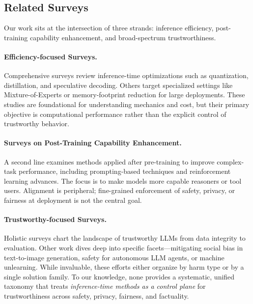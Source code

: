 \subsection{Related Surveys}
Our work sits at the intersection of three strands: inference efficiency, post-training capability enhancement, and broad-spectrum trustworthiness.

\paragraph{Efficiency-focused Surveys.}
Comprehensive surveys review inference-time optimizations such as quantization, distillation, and speculative decoding\citep{survey:inference_efficiency1}. Others target specialized settings like Mixture-of-Experts\citep{survey:inference_moe} or memory-footprint reduction for large deployments\citep{survey:inference_efficiency2}. These studies are foundational for understanding mechanics and cost, but their primary objective is computational performance rather than the explicit control of trustworthy behavior.

\paragraph{Surveys on Post-Training Capability Enhancement.}
A second line examines methods applied after pre-training to improve complex-task performance, including prompting-based techniques and reinforcement learning advances\citep{survey:post-training1, survey:post-training2}. The focus is to make models more capable reasoners or tool users. Alignment is peripheral; fine-grained enforcement of safety, privacy, or fairness at deployment is not the central goal.

\paragraph{Trustworthy-focused Surveys.}
Holistic surveys chart the landscape of trustworthy LLMs from data integrity to evaluation\citep{survey:trustworthy1, survey:trustworthy2}. Other work dives deep into specific facets---mitigating social bias in text-to-image generation\citep{survey:trustworthy_text2img}, safety for autonomous LLM agents\citep{survey:trustworthy_agents}, or machine unlearning\citep{survey:unlearning1, survey:unlearning2}. While invaluable, these efforts either organize by harm type or by a single solution family. To our knowledge, none provides a systematic, unified taxonomy that treats \emph{inference-time methods as a control plane} for trustworthiness across safety, privacy, fairness, and factuality.

